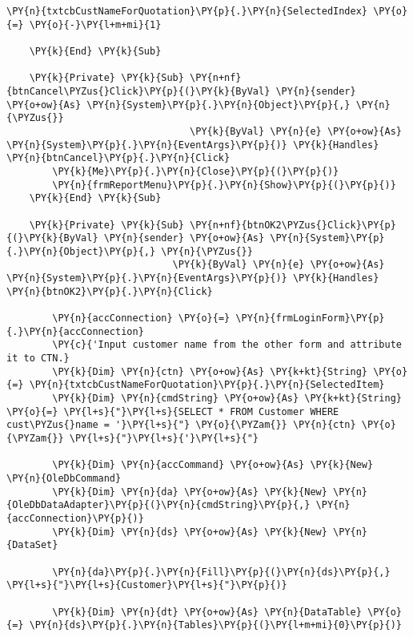 \begin{Verbatim}[commandchars=\\\{\}]
        \PY{n}{txtcbCustNameForQuotation}\PY{p}{.}\PY{n}{SelectedIndex} \PY{o}{=} \PY{o}{-}\PY{l+m+mi}{1}

    \PY{k}{End} \PY{k}{Sub}

    \PY{k}{Private} \PY{k}{Sub} \PY{n+nf}{btnCancel\PYZus{}Click}\PY{p}{(}\PY{k}{ByVal} \PY{n}{sender} \PY{o+ow}{As} \PY{n}{System}\PY{p}{.}\PY{n}{Object}\PY{p}{,} \PY{n}{\PYZus{}}
                                \PY{k}{ByVal} \PY{n}{e} \PY{o+ow}{As} \PY{n}{System}\PY{p}{.}\PY{n}{EventArgs}\PY{p}{)} \PY{k}{Handles} \PY{n}{btnCancel}\PY{p}{.}\PY{n}{Click}
        \PY{k}{Me}\PY{p}{.}\PY{n}{Close}\PY{p}{(}\PY{p}{)}
        \PY{n}{frmReportMenu}\PY{p}{.}\PY{n}{Show}\PY{p}{(}\PY{p}{)}
    \PY{k}{End} \PY{k}{Sub}

    \PY{k}{Private} \PY{k}{Sub} \PY{n+nf}{btnOK2\PYZus{}Click}\PY{p}{(}\PY{k}{ByVal} \PY{n}{sender} \PY{o+ow}{As} \PY{n}{System}\PY{p}{.}\PY{n}{Object}\PY{p}{,} \PY{n}{\PYZus{}}
                             \PY{k}{ByVal} \PY{n}{e} \PY{o+ow}{As} \PY{n}{System}\PY{p}{.}\PY{n}{EventArgs}\PY{p}{)} \PY{k}{Handles} \PY{n}{btnOK2}\PY{p}{.}\PY{n}{Click}

        \PY{n}{accConnection} \PY{o}{=} \PY{n}{frmLoginForm}\PY{p}{.}\PY{n}{accConnection}
        \PY{c}{'Input customer name from the other form and attribute it to CTN.}
        \PY{k}{Dim} \PY{n}{ctn} \PY{o+ow}{As} \PY{k+kt}{String} \PY{o}{=} \PY{n}{txtcbCustNameForQuotation}\PY{p}{.}\PY{n}{SelectedItem}
        \PY{k}{Dim} \PY{n}{cmdString} \PY{o+ow}{As} \PY{k+kt}{String} \PY{o}{=} \PY{l+s}{"}\PY{l+s}{SELECT * FROM Customer WHERE cust\PYZus{}name = '}\PY{l+s}{"} \PY{o}{\PYZam{}} \PY{n}{ctn} \PY{o}{\PYZam{}} \PY{l+s}{"}\PY{l+s}{'}\PY{l+s}{"}

        \PY{k}{Dim} \PY{n}{accCommand} \PY{o+ow}{As} \PY{k}{New} \PY{n}{OleDbCommand}
        \PY{k}{Dim} \PY{n}{da} \PY{o+ow}{As} \PY{k}{New} \PY{n}{OleDbDataAdapter}\PY{p}{(}\PY{n}{cmdString}\PY{p}{,} \PY{n}{accConnection}\PY{p}{)}
        \PY{k}{Dim} \PY{n}{ds} \PY{o+ow}{As} \PY{k}{New} \PY{n}{DataSet}

        \PY{n}{da}\PY{p}{.}\PY{n}{Fill}\PY{p}{(}\PY{n}{ds}\PY{p}{,} \PY{l+s}{"}\PY{l+s}{Customer}\PY{l+s}{"}\PY{p}{)}

        \PY{k}{Dim} \PY{n}{dt} \PY{o+ow}{As} \PY{n}{DataTable} \PY{o}{=} \PY{n}{ds}\PY{p}{.}\PY{n}{Tables}\PY{p}{(}\PY{l+m+mi}{0}\PY{p}{)}


\end{Verbatim}
